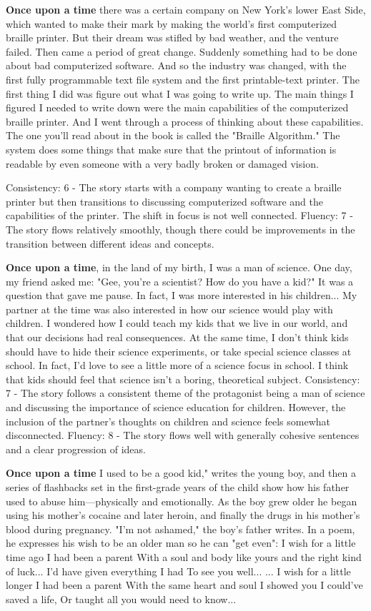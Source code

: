 \documentclass{article}
\begin{document}
\textbf{Once upon a time} there was a certain company on New York's lower East Side, which wanted to make their mark by making the world's first computerized braille printer. But their dream was stifled by bad weather, and the venture failed. Then came a period of great change. Suddenly something had to be done about bad computerized software. And so the industry was changed, with the first fully programmable text file system and the first printable-text printer. The first thing I did was figure out what I was going to write up. The main things I figured I needed to write down were the main capabilities of the computerized braille printer. And I went through a process of thinking about these capabilities. The one you'll read about in the book is called the "Braille Algorithm." The system does some things that make sure that the printout of information is readable by even someone with a very badly broken or damaged vision.

Consistency: 6 - The story starts with a company wanting to create a braille printer but then transitions to discussing computerized software and the capabilities of the printer. The shift in focus is not well connected.
Fluency: 7 - The story flows relatively smoothly, though there could be improvements in the transition between different ideas and concepts.

\textbf{Once upon a time}, in the land of my birth, I was a man of science. One day, my friend asked me: "Gee, you're a scientist? How do you have a kid?" It was a question that gave me pause. In fact, I was more interested in his children... My partner at the time was also interested in how our science would play with children. I wondered how I could teach my kids that we live in our world, and that our decisions had real consequences. At the same time, I don't think kids should have to hide their science experiments, or take special science classes at school. In fact, I'd love to see a little more of a science focus in school. I think that kids should feel that science isn't a boring, theoretical subject.
Consistency: 7 - The story follows a consistent theme of the protagonist being a man of science and discussing the importance of science education for children. However, the inclusion of the partner's thoughts on children and science feels somewhat disconnected.
Fluency: 8 - The story flows well with generally cohesive sentences and a clear progression of ideas.

\textbf{Once upon a time} I used to be a good kid," writes the young boy, and then a series of flashbacks set in the first-grade years of the child show how his father used to abuse him—physically and emotionally. As the boy grew older he began using his mother's cocaine and later heroin, and finally the drugs in his mother's blood during pregnancy. "I'm not ashamed," the boy's father writes. In a poem, he expresses his wish to be an older man so he can "get even": I wish for a little time ago I had been a parent With a soul and body like yours and the right kind of luck... I'd have given everything I had To see you well... ... I wish for a little longer I had been a parent With the same heart and soul I showed you I could've saved a life, Or taught all you would need to know...
\end{document}
